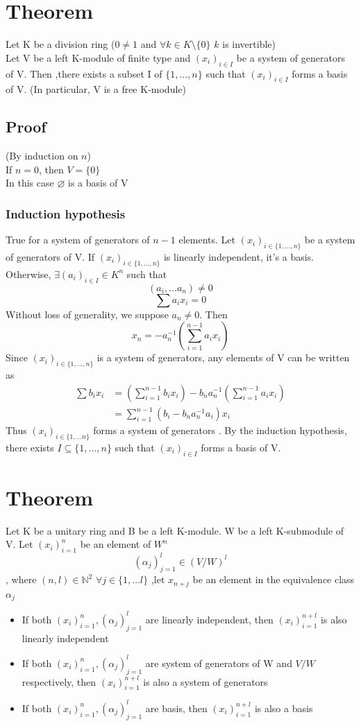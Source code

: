 \documentclass{book}
\begin{document}
\section{Theorem}
Let K be a division ring ($0\not=1$ and $\forall k\in K\setminus \{0\}$ $k$ is invertible)
\\Let V be a left K-module of finite type and $(x_i)_{i\in I}$ be a system of generators of V. Then ,there exists a subset I of $\{1,...,n\}$ such that $(x_i)_{i\in I}$ forms a basis of V. (In particular, V is a free K-module)
\subsection*{Proof}
(By induction on $n$)\\
If $n=0$, then $V=\{0\}$\\
In this case $\varnothing$ is a basis of V
\subsubsection*{Induction hypothesis}
True for a system of generators of $n-1$ elements.
Let $(x_i)_{i\in \{1,...,n\}}$ be a system of generators of V. If $(x_i)_{i\in \{1,...,n\}}$ is linearly independent, it's a basis. Otherwise, $\exists (a_i)_{i\in I}\in K^n$ such that $$(a_i,...a_n)\not=0$$ $$\sum a_ix_i=0$$
Without loss of generality, we suppose $a_n\not=0$. Then $$x_n=-a_n^{-1}(\sum\limits_{i=1}^{n-1} a_ix_i)$$
Since $(x_i)_{i\in \{1,...,n\}}$ is a system of generators, any elements of V can be written as $$\begin{aligned}
    \sum b_ix_i&=(\sum\limits_{i=1}^{n-1} b_ix_i)-b_na_n^{-1}(\sum\limits_{i=1}^{n-1}a_ix_i)\\
    &=\sum\limits_{i=1}^{n-1}(b_i-b_na_n^{-1}a_i)x_i
\end{aligned}$$
Thus $(x_i)_{i\in \{1,...n\}}$ forms a system of generators . By the induction hypothesis, there exists $I\subseteq \{1,...,n\}$ such that $(x_i)_{i\in I}$ forms a basis of V.
\section{Theorem}
Let K be a unitary ring and B be a left K-module.
W be a left K-submodule of V. Let $(x_i)_{i=1}^n$ be an element of $W^n$$$(\alpha_j)^l_{j=1}\in (V/W)^l$$, where $(n,l)\in\mathbb{N}^2$ $\forall j\in \{1,...l\}$ ,let $x_{n+j}$ be an element in the equivalence class $\alpha_j$
\begin{itemize}
    \item If both $(x_i)_{i=1}^n, (\alpha_j)_{j=1}^l$ are linearly independent, then $(x_i)_{i=1}^{n+l}$ is also linearly independent
    \item If both $(x_i)_{i=1}^n, (\alpha_j)_{j=1}^l$ are system of generators of W and $V/W$ respectively, then $(x_i)_{i=1}^{n+l}$ is also a system of generators
    \item If both $(x_i)_{i=1}^n, (\alpha_j)_{j=1}^l$ are basis, then $(x_i)_{i=1}^{n+l}$ is also a basis
\end{itemize}
\end{document}
